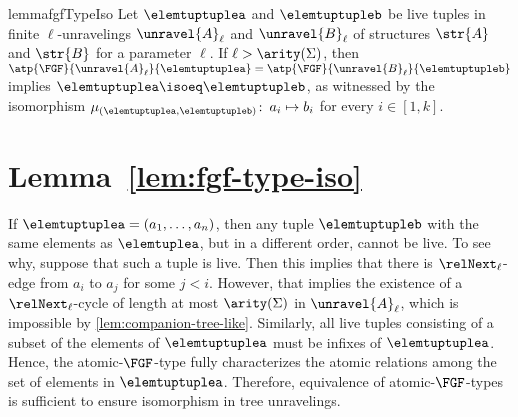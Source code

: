 \ifmainpart
\begin{restatable}{lemma}{fgfTypeIso}\label{lem:fgf-type-iso}
  Let $\elemtuptuplea$ and $\elemtuptupleb$ be live tuples in finite $\ell$-unravelings $\unravel{A}_{\ell}$ and $\unravel{B}_{\ell}$ of structures $\str{A}$ and $\str{B}$ for a parameter $\ell$.
  If $\ell > \arity(\Sigma)$, then $\atp{\FGF}{\unravel{A}_{\ell}}{\elemtuptuplea} = \atp{\FGF}{\unravel{B}_{\ell}}{\elemtuptupleb}$ implies $\elemtuptuplea \isoeq \elemtuptupleb$, as witnessed by the isomorphism $\mu_{(\elemtuptuplea, \elemtuptupleb)}\colon\, a_{i} \mapsto b_{i}$ for every $i \in [1, k]$.
\end{restatable}
\else
  \section{Lemma~\ref{lem:fgf-type-iso}}
  \fgfTypeIso*
\fi
\ifmainpart
\begin{proofsketch}
  If $\elemtuptuplea = (a_{1}, \ldots, a_{n})$, then any tuple $\elemtuptupleb$ with the same elements as $\elemtuplea$, but in a different order, cannot be live.
  To see why, suppose that such a tuple is live.
  Then this implies that there is $\relNext_{\ell}$-edge from $a_{i}$ to $a_{j}$ for some $j < i$.
  However, that implies the existence of a $\relNext_{\ell}$-cycle of length at most $\arity(\Sigma)$ in $\unravel{A}_{\ell}$, which is impossible by \cref{lem:companion-tree-like}.
  Similarly, all live tuples consisting of a subset of the elements of $\elemtuptuplea$ must be infixes of $\elemtuptuplea$.
  Hence, the atomic-$\FGF$-type fully characterizes the atomic relations among the set of elements in $\elemtuptuplea$.
  Therefore, equivalence of atomic-$\FGF$-types is sufficient to ensure isomorphism in tree unravelings.
\end{proofsketch}
\else
